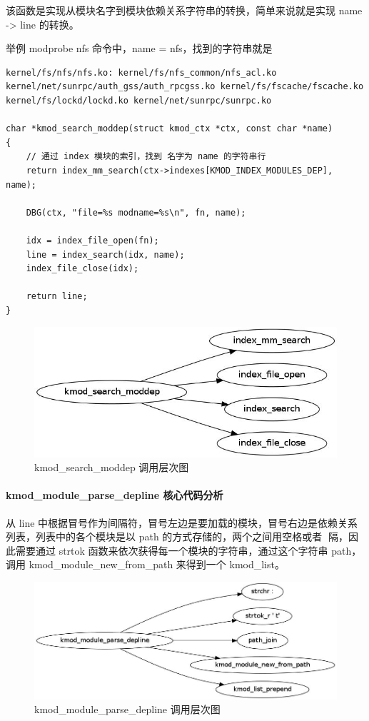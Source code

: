 \documentclass[11pt,a4paper]{article}
\makeatletter
\def\maxwidth{\ifdim\Gin@nat@width>\linewidth\linewidth
\else\Gin@nat@width\fi}
\let\Oldincludegraphics\includegraphics
\renewcommand{\includegraphics}[1]{\Oldincludegraphics[width=\maxwidth]{#1}}
\makeatother
\begin{document}
该函数是实现从模块名字到模块依赖关系字符串的转换，简单来说就是实现 name
-\textgreater{} line 的转换。

举例 modprobe nfs 命令中，name = nfs，找到的字符串就是

{\begin{shaded}\begin{verbatim}
kernel/fs/nfs/nfs.ko: kernel/fs/nfs_common/nfs_acl.ko kernel/net/sunrpc/auth_gss/auth_rpcgss.ko kernel/fs/fscache/fscache.ko kernel/fs/lockd/lockd.ko kernel/net/sunrpc/sunrpc.ko

char *kmod_search_moddep(struct kmod_ctx *ctx, const char *name)
{
    // 通过 index 模块的索引，找到 名字为 name 的字符串行
    return index_mm_search(ctx->indexes[KMOD_INDEX_MODULES_DEP], name);

    DBG(ctx, "file=%s modname=%s\n", fn, name);

    idx = index_file_open(fn);
    line = index_search(idx, name);
    index_file_close(idx);

    return line;
}
\end{verbatim}\end{shaded}}
\begin{figure}[htbp]
\centering
\includegraphics{./figures/kmod_search_moddep.jpg}
\caption{kmod\_search\_moddep 调用层次图}
\end{figure}

\paragraph{kmod\_module\_parse\_depline 核心代码分析}

从 line
中根据冒号作为间隔符，冒号左边是要加载的模块，冒号右边是依赖关系列表，列表中的各个模块是以
path 的方式存储的，两个之间用空格或者 \t 间隔，因此需要通过 strtok
函数来依次获得每一个模块的字符串，通过这个字符串 path，调用
kmod\_module\_new\_from\_path 来得到一个 kmod\_list。

\begin{figure}[htbp]
\centering
\includegraphics{./figures/kmod_module_parse_depline.jpg}
\caption{kmod\_module\_parse\_depline 调用层次图}
\end{figure}
\end{document}
